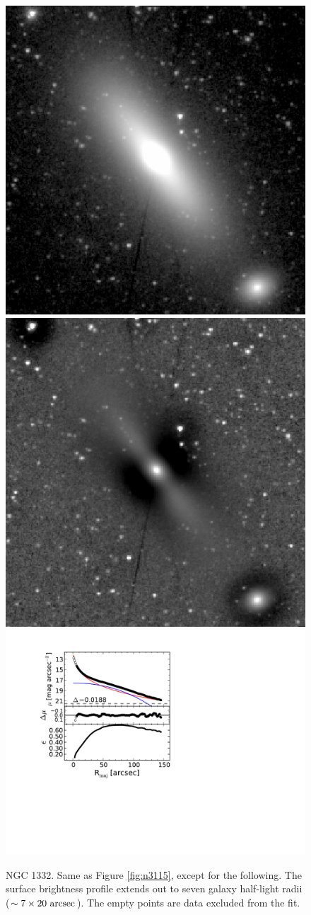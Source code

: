 \documentclass[useAMS,usenatbib,article]{mnras}
\begin{document}
\begin{figure}
\begin{center}
\includegraphics[width=0.49\columnwidth]{n1332_image}
\includegraphics[width=0.49\columnwidth]{n1332_unsharp} \\
\includegraphics[width=1.03\columnwidth]{n1332_decomposition.pdf}
\caption{NGC 1332.
Same as Figure \ref{fig:n3115}, except for the following. 
The surface brightness profile extends out to seven galaxy half-light radii ($\sim 7 \times 20~\rm arcsec$). 
The empty points are data excluded from the fit. 
}
\label{fig:n1332}
\end{center}
\end{figure}
\end{document}
